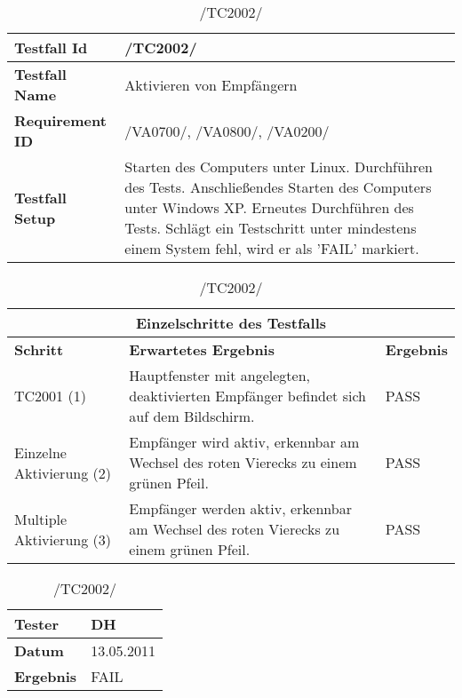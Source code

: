 \begin{table}[h]
\caption{/TC2002/}
\label{tab:TC2002}
\begin{center}
\begin{tabular}{|p{3.5cm}|p{11cm}|}
\hline
\textbf{Testfall Id} & /TC2002/\\
\hline
\textbf{Testfall Name} & Aktivieren von Empfängern\\
\hline
\textbf{Requirement ID} & /VA0700/, /VA0800/, /VA0200/\\
\hline
\textbf{Testfall Setup} & Starten des Computers unter Linux. Durchführen des Tests.
Anschließendes Starten des Computers unter Windows XP. Erneutes Durchführen des Tests. Schlägt ein Testschritt unter mindestens einem System fehl, wird er als 'FAIL' markiert.\\
\hline
\end{tabular}
\begin{tabular}{|p{4cm}|p{7.8cm}|p{2.3cm}|}
\multicolumn{3}{|c|}{\textbf{Einzelschritte des Testfalls}} \\
\hline
\textbf{Schritt} & \textbf{Erwartetes Ergebnis} & \textbf{Ergebnis}\\
\hline
TC2001 (1)& Hauptfenster mit angelegten,
deaktivierten Empfänger befindet sich auf dem Bildschirm. & PASS\\
\hline
Einzelne Aktivierung (2) & Empfänger wird aktiv, erkennbar am
Wechsel des roten Vierecks zu einem grünen Pfeil. & PASS\\
\hline
Multiple Aktivierung (3) & Empfänger werden aktiv,
erkennbar am Wechsel des roten Vierecks zu einem grünen Pfeil. & PASS\\
\hline
\end{tabular}
\begin{tabular}{|p{3.5cm}|p{11cm}|}
\textbf{Tester} & DH\\
\hline
\textbf{Datum} & 13.05.2011\\
\hline
\textbf{Ergebnis} & FAIL\\
\hline
\end{tabular}
\end{center}
\end{table}

